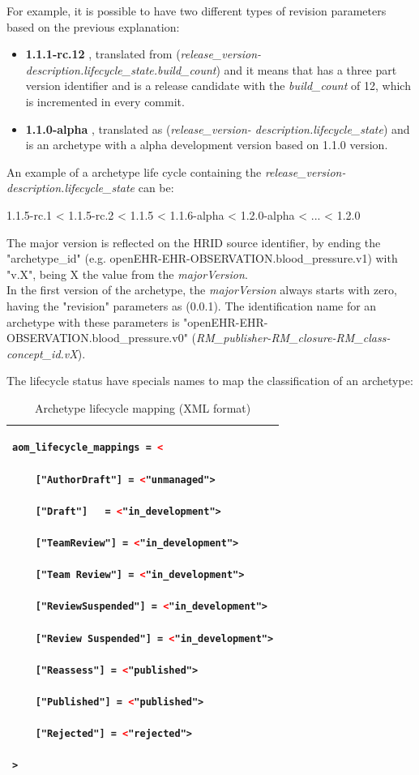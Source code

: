 \documentclass[mim_thesis.tex]{subfiles}
\begin{document}
For example, it is possible to have two different types of revision parameters based on the previous explanation:

\begin{itemize}
\item \textbf{1.1.1-rc.12} , translated from (\textit{release\_version-description.lifecycle\_state.build\_count}) and it means that has a three part version identifier and is a release candidate with the \textit{build\_count} of 12, which is incremented in every commit.
\item \textbf{1.1.0-alpha} , translated as (\textit{release\_version- description.lifecycle\_state}) and is an archetype with a alpha development version based on 1.1.0 version. 
\end{itemize}

An example of a archetype life cycle containing the \textit{release\_version-description.lifecycle\_state} can be: 
\begin{center}
{1.1.5-rc.1 < 1.1.5-rc.2 < 1.1.5 < 1.1.6-alpha < 1.2.0-alpha < ... < 1.2.0}
\end{center}

The major version is reflected on the HRID source identifier, by ending the "archetype\_id" (e.g. openEHR-EHR-OBSERVATION.blood\_pressure.v1) with "v.X", being X the value from the \textit{majorVersion}. \\

In the first version of the archetype, the  \textit{majorVersion} always starts with zero, having the "revision" parameters as (0.0.1). The identification name for an archetype with these parameters is "openEHR-EHR-OBSERVATION.blood\_pressure.v0" (\textit{RM\_publisher-RM\_closure-RM\_class-concept\_id.vX}).

\newpage
The lifecycle status have specials names to map the classification of an archetype:
\begin{table}[H]
\caption{Archetype lifecycle mapping (XML format)}
\label{tab:arch_lifecycle_xml}
\centering
\begin{tabular}{l}
\toprule[2pt]
\begin{lstlisting}[language=XML]
aom_lifecycle_mappings = <

	["AuthorDraft"] = <"unmanaged">
    
	["Draft"]	= <"in_development">
    
	["TeamReview"] = <"in_development">
    
	["Team Review"] = <"in_development">
    
	["ReviewSuspended"] = <"in_development">
    
	["Review Suspended"] = <"in_development">
    
	["Reassess"] = <"published">
    
	["Published"] = <"published">
    
	["Rejected"] = <"rejected">

>
\end{lstlisting}
\tabularnewline \bottomrule[2pt]
\end{tabular}
\end{table}
\end{document}
